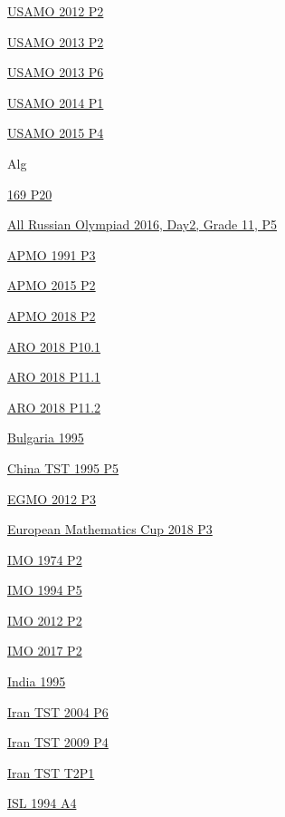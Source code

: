 \hyperref  [problem:USAMO 2012 P2]{USAMO 2012 P2}

\hyperref  [problem:USAMO 2013 P2]{USAMO 2013 P2}

\hyperref  [problem:USAMO 2013 P6]{USAMO 2013 P6}

\hyperref  [problem:USAMO 2014 P1]{USAMO 2014 P1}

\hyperref  [problem:USAMO 2015 P4]{USAMO 2015 P4}


\newpage Alg


\hyperref  [problem:169 P20]{169 P20}

\hyperref  [problem:]{}

\hyperref  [problem:]{}

\hyperref  [problem:All Russian Olympiad 2016, Day2, Grade 11, P5]{All Russian Olympiad 2016, Day2, Grade 11, P5}

\hyperref  [problem:APMO 1991 P3]{APMO 1991 P3}

\hyperref  [problem:APMO 2015 P2]{APMO 2015 P2}

\hyperref  [problem:APMO 2018 P2]{APMO 2018 P2}

\hyperref  [problem:ARO 2018 P10.1]{ARO 2018 P10.1}

\hyperref  [problem:ARO 2018 P11.1]{ARO 2018 P11.1}

\hyperref  [problem:ARO 2018 P11.2]{ARO 2018 P11.2}

\hyperref  [problem:Bulgaria 1995]{Bulgaria 1995}

\hyperref  [problem:China TST 1995 P5]{China TST 1995 P5}

\hyperref  [problem:EGMO 2012 P3]{EGMO 2012 P3}

\hyperref  [problem:European Mathematics Cup 2018 P3]{European Mathematics Cup 2018 P3}

\hyperref  [problem:IMO 1974 P2]{IMO 1974 P2}

\hyperref  [problem:IMO 1994 P5]{IMO 1994 P5}

\hyperref  [problem:IMO 2012 P2]{IMO 2012 P2}

\hyperref  [problem:IMO 2017 P2]{IMO 2017 P2}

\hyperref  [problem:India 1995]{India 1995}

\hyperref  [problem:Iran TST 2004 P6]{Iran TST 2004 P6}

\hyperref  [problem:Iran TST 2009 P4]{Iran TST 2009 P4}

\hyperref  [problem:Iran TST T2P1]{Iran TST T2P1}

\hyperref  [problem:ISL 1994 A4]{ISL 1994 A4}


